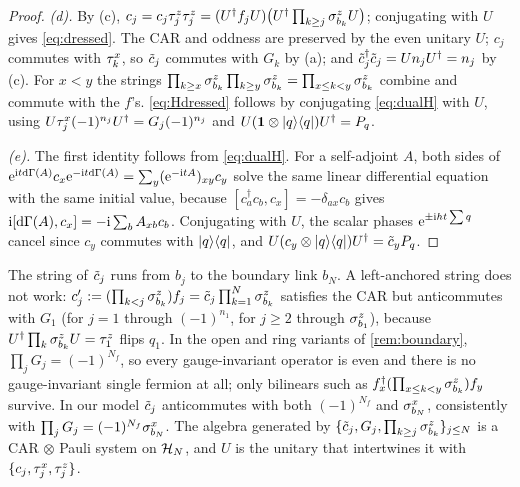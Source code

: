 \begin{proof}
\emph{(d).}  By (c), $c_j=c_j\tau^{z}_{j}\tau^{z}_{j}=(U^\dagger f_jU)\bigl(U^\dagger\prod_{k\ge j}\sigma^{z}_{b_{k}}U\bigr)$;
conjugating with $U$ gives \eqref{eq:dressed}.  The CAR and oddness are preserved by the even unitary
$U$; $c_j$ commutes with $\tau^{x}_{k}$, so $\tilde c_j$ commutes with $G_k$ by (a); and
$\tilde c_j^\dagger\tilde c_j=Un_jU^\dagger=n_j$ by (c).  For $x<y$ the strings
$\prod_{k\ge x}\sigma^{z}_{b_{k}}\prod_{k\ge y}\sigma^{z}_{b_{k}}=\prod_{x\le k<y}\sigma^{z}_{b_{k}}$ combine and commute with the
$f$'s.  \eqref{eq:Hdressed} follows by conjugating \eqref{eq:dualH} with $U$, using
$U\tau^{x}_{j}(-1)^{n_j}U^\dagger=G_j(-1)^{n_j}$ and $U(\mathbf{1}\otimes|q\rangle\langle q|)U^\dagger=P_q$.

\emph{(e).}  The first identity follows from \eqref{eq:dualH}.  For a self-adjoint $A$, both sides of
$\mathrm{e}^{\mathrm{i} t\mathrm{d}\Gamma(A)}c_x\mathrm{e}^{-\mathrm{i} t\mathrm{d}\Gamma(A)}=\sum_y(\mathrm{e}^{-\mathrm{i} tA})_{xy}c_y$ solve the same linear
differential equation with the same initial value, because $[c_a^\dagger c_b,c_x]=-\delta_{ax}c_b$
gives $\mathrm{i}[\mathrm{d}\Gamma(A),c_x]=-\mathrm{i}\sum_bA_{xb}c_b$.  Conjugating with $U$, the scalar phases
$\mathrm{e}^{\pm\mathrm{i} ht\sum q}$ cancel since $c_y$ commutes with $|q\rangle\langle q|$, and
$U(c_y\otimes|q\rangle\langle q|)U^\dagger=\tilde c_yP_q$.
\end{proof}

\begin{remark}\label{rem:strings}
The string of $\tilde c_j$ runs from $b_j$ to the boundary link $b_N$.  A left-anchored string does not
work: $c'_j:=(\prod_{k<j}\sigma^{z}_{b_{k}})f_j=\tilde c_j\prod_{k=1}^N\sigma^{z}_{b_{k}}$ satisfies the CAR but anticommutes
with $G_1$ (for $j=1$ through $(-1)^{n_1}$, for $j\ge2$ through $\sigma^{z}_{b_{1}}$), because
$U^\dagger\prod_k\sigma^{z}_{b_{k}}U=\tau^{z}_{1}$ flips $q_1$.  In the open and ring variants of
\cref{rem:boundary}, $\prod_jG_j=(-1)^{N_f}$, so every gauge-invariant operator is even and there is
no gauge-invariant single fermion at all; only bilinears such as
$f_x^\dagger(\prod_{x\le k<y}\sigma^{z}_{b_{k}})f_y$ survive.  In our model $\tilde c_j$ anticommutes with both
$(-1)^{N_f}$ and $\sigma^{x}_{b_{N}}$, consistently with $\prod_jG_j=(-1)^{N_f}\sigma^{x}_{b_{N}}$.  The algebra generated
by $\{\tilde c_j,G_j,\prod_{k\ge j}\sigma^{z}_{b_{k}}\}_{j\le N}$ is a CAR$\,\otimes\,$Pauli system on $\mathcal{H}_N$, and $U$
is the unitary that intertwines it with $\{c_j,\tau^{x}_{j},\tau^{z}_{j}\}$.
\end{remark}

